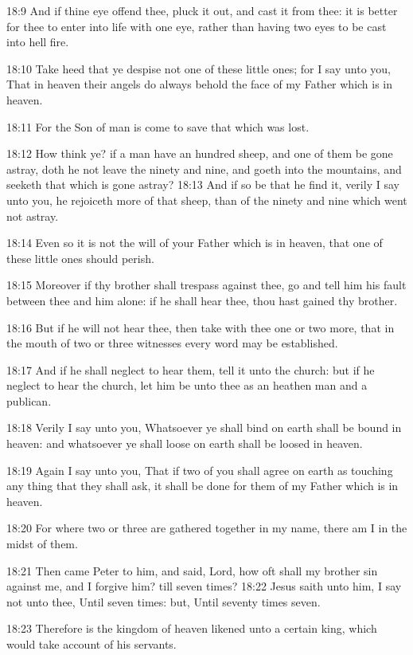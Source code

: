 18:9 And if thine eye offend thee, pluck it out, and cast it from
thee: it is better for thee to enter into life with one eye, rather
than having two eyes to be cast into hell fire.

18:10 Take heed that ye despise not one of these little ones; for I
say unto you, That in heaven their angels do always behold the face of
my Father which is in heaven.

18:11 For the Son of man is come to save that which was lost.

18:12 How think ye? if a man have an hundred sheep, and one of them be
gone astray, doth he not leave the ninety and nine, and goeth into the
mountains, and seeketh that which is gone astray?  18:13 And if so be
that he find it, verily I say unto you, he rejoiceth more of that
sheep, than of the ninety and nine which went not astray.

18:14 Even so it is not the will of your Father which is in heaven,
that one of these little ones should perish.

18:15 Moreover if thy brother shall trespass against thee, go and tell
him his fault between thee and him alone: if he shall hear thee, thou
hast gained thy brother.

18:16 But if he will not hear thee, then take with thee one or two
more, that in the mouth of two or three witnesses every word may be
established.

18:17 And if he shall neglect to hear them, tell it unto the church:
but if he neglect to hear the church, let him be unto thee as an
heathen man and a publican.

18:18 Verily I say unto you, Whatsoever ye shall bind on earth shall
be bound in heaven: and whatsoever ye shall loose on earth shall be
loosed in heaven.

18:19 Again I say unto you, That if two of you shall agree on earth as
touching any thing that they shall ask, it shall be done for them of
my Father which is in heaven.

18:20 For where two or three are gathered together in my name, there
am I in the midst of them.

18:21 Then came Peter to him, and said, Lord, how oft shall my brother
sin against me, and I forgive him? till seven times?  18:22 Jesus
saith unto him, I say not unto thee, Until seven times: but, Until
seventy times seven.

18:23 Therefore is the kingdom of heaven likened unto a certain king,
which would take account of his servants.

